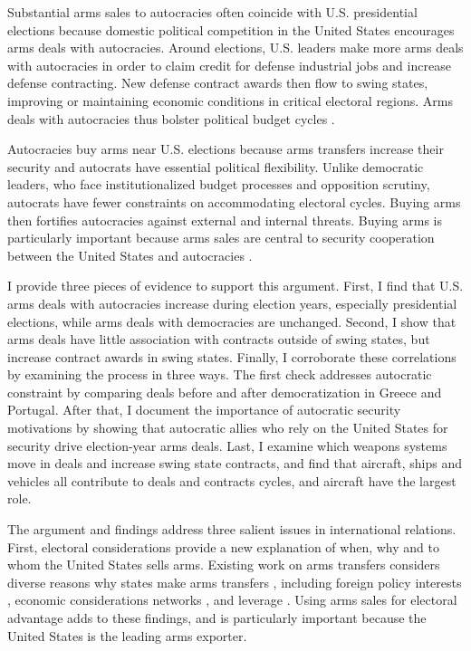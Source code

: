 \documentclass[12pt]{article}
\begin{document}
Substantial arms sales to autocracies often coincide with U.S. presidential elections because domestic political competition in the United States encourages arms deals with autocracies. 
Around elections, U.S. leaders make more arms deals with autocracies in order to claim credit for defense industrial jobs and increase defense contracting.
New defense contract awards then flow to swing states, improving or maintaining economic conditions in critical electoral regions.
Arms deals with autocracies thus bolster political budget cycles \citep{Tufte1978, Mintz1988, DerouenHeo2000}. 


Autocracies buy arms near U.S. elections because arms transfers increase their security and autocrats have essential political flexibility. 
Unlike democratic leaders, who face institutionalized budget processes and opposition scrutiny, autocrats have fewer constraints on accommodating electoral cycles.
Buying arms then fortifies autocracies against external and internal threats.
Buying arms is particularly important because arms sales are central to security cooperation between the United States and autocracies \citep{Yarhi-Miloetal2016, McManusYarhi-Milo2017}.



I provide three pieces of evidence to support this argument.
First, I find that U.S. arms deals with autocracies increase during election years, especially presidential elections, while arms deals with democracies are unchanged. 
Second, I show that arms deals have little association with contracts outside of swing states, but increase contract awards in swing states. 
Finally, I corroborate these correlations by examining the process in three ways.
The first check addresses autocratic constraint by comparing deals before and after democratization in Greece and Portugal. 
After that, I document the importance of autocratic security motivations by showing that autocratic allies who rely on the United States for security drive election-year arms deals. 
Last, I examine which weapons systems move in deals and increase swing state contracts, and find that aircraft, ships and vehicles all contribute to deals and contracts cycles, and aircraft have the largest role. 


The argument and findings address three salient issues in international relations. 
First, electoral considerations provide a new explanation of when, why and to whom the United States sells arms. 
Existing work on arms transfers considers diverse reasons why states make arms transfers \citep{WillardsonJohnson2022}, including foreign policy interests \citep{Thralletal2020}, economic considerations \citep{Bitzinger1994} networks \citep{Thurneretal2019}, and leverage \citep{Spindel2023}. 
Using arms sales for electoral advantage adds to these findings, and is particularly important because the United States is the leading arms exporter.
\end{document}
